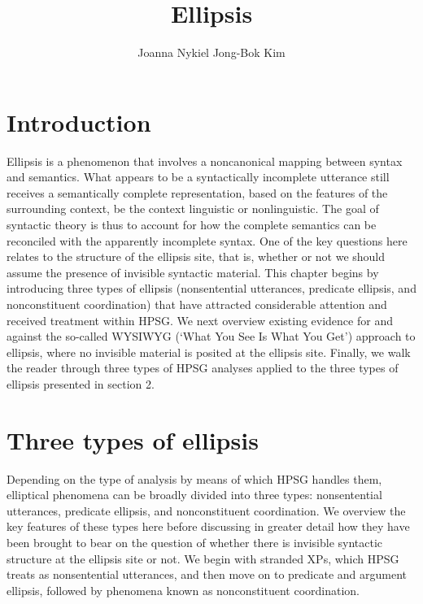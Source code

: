 \documentclass[output=paper
                ,modfonts
                ,nonflat
	        ,collection
	        ,collectionchapter
	        ,collectiontoclongg
 	        ,biblatex
                ,babelshorthands
                ,newtxmath
                ,draftmode
                ,colorlinks, citecolor=brown
]{./langsci/langscibook}
\author{%
	Joanna Nykiel\affiliation{Kyung Hee University, Seoul}%
	\lastand Jong-Bok Kim\affiliation{Kyung Hee University, Seoul}%
}
\title{Ellipsis}
\begin{document}
\maketitle
\label{chap-ellipsis}

{

\section{Introduction}
         Ellipsis is a phenomenon that involves a noncanonical mapping between syntax and semantics. What appears to be a syntactically incomplete utterance still receives a semantically complete representation, based on the features of the surrounding context, be the context linguistic or nonlinguistic. The goal of syntactic theory is thus to account for how the complete semantics can be reconciled with the apparently incomplete syntax. One of the key questions here relates to the structure of the ellipsis site, that is, whether or not we should assume the presence of invisible syntactic material. This chapter begins by introducing three types of ellipsis (nonsentential utterances, predicate ellipsis, and nonconstituent coordination) that have attracted considerable attention and received treatment within HPSG. We next overview existing evidence for and against the so-called WYSIWYG (`What You See Is What You Get') approach to ellipsis, where no invisible material is posited at the ellipsis site. Finally, we walk the reader through three types of HPSG analyses applied to the three types of ellipsis presented in section 2.


\section{Three types of ellipsis}
         Depending on the type of analysis by means of which HPSG handles them, elliptical phenomena can be broadly divided into three types:
         nonsentential utterances, predicate ellipsis, and nonconstituent coordination.
          We overview the key features of these types here before discussing in greater detail how they have been brought to bear on the question of whether there is invisible syntactic structure at the ellipsis site or not. We begin with stranded XPs, which HPSG treats as nonsentential utterances, and then move on to predicate and argument ellipsis, followed by phenomena known as nonconstituent coordination.

}
\end{document}
